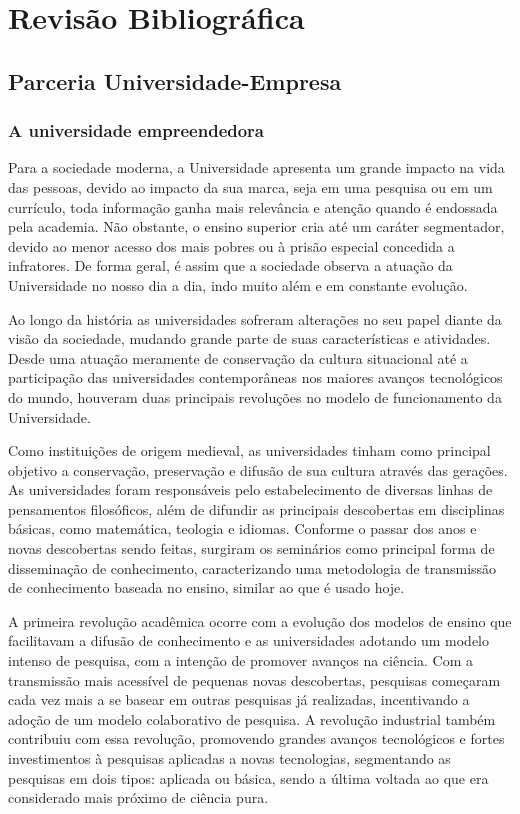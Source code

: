 \chapter[Revisão Bibliográfica]{Revisão Bibliográfica}
\label{chap:revisao}

\section{Parceria Universidade-Empresa}
\label{cha:ensino}
\subsection{A universidade empreendedora}
\label{cha:univ_empreend}

Para a sociedade moderna, a Universidade apresenta um grande impacto na vida das pessoas, devido ao impacto da sua marca, seja em uma pesquisa ou em um currículo, toda informação ganha mais relevância e atenção quando é endossada pela academia. Não obstante, o ensino superior cria até um caráter segmentador, devido ao menor acesso dos mais pobres ou à prisão especial concedida a infratores. De forma geral, é assim que a sociedade observa a atuação da Universidade no nosso dia a dia, indo muito além e em constante evolução.

Ao longo da história as universidades sofreram alterações no seu papel diante da visão da sociedade, mudando grande parte de suas características e atividades. Desde uma atuação meramente de conservação da cultura situacional até a participação das universidades contemporâneas nos maiores avanços tecnológicos do mundo, houveram duas principais revoluções no modelo de funcionamento da Universidade. \cite{etzkowitz2001}

Como instituições de origem medieval, as universidades tinham como principal objetivo a conservação, preservação e difusão de sua cultura através das gerações. As universidades foram responsáveis pelo estabelecimento de diversas linhas de pensamentos filosóficos, além de difundir as principais descobertas em disciplinas básicas, como matemática, teologia e idiomas. Conforme o passar dos anos e novas descobertas sendo feitas, surgiram os seminários como principal forma de disseminação de conhecimento, caracterizando uma metodologia de transmissão de conhecimento baseada no ensino, similar ao que é usado hoje. 

A primeira revolução acadêmica ocorre com a evolução dos modelos de ensino que facilitavam a difusão de conhecimento e as universidades adotando um modelo intenso de pesquisa, com a intenção de promover avanços na ciência. Com a transmissão mais acessível de pequenas novas descobertas, pesquisas começaram cada vez mais a se basear em outras pesquisas já realizadas, incentivando a adoção de um modelo colaborativo de pesquisa. A revolução industrial também contribuiu com essa revolução, promovendo grandes avanços tecnológicos e fortes investimentos à pesquisas aplicadas a novas tecnologias, segmentando as pesquisas em dois tipos: aplicada ou básica, sendo a última voltada ao que era considerado mais próximo de ciência pura.

